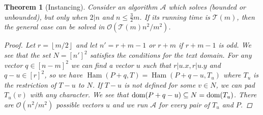 \documentclass[11pt]{article}
\renewcommand{\O}{\mathcal{O}}
\newcommand{\floor}[1]{\left\lfloor #1 \right\rfloor}
\theoremstyle{plain}
\newtheorem{theorem}{Theorem}
\theoremstyle{definition}
\theoremstyle{remark}
\DeclareMathOperator*{\Ham}{Ham}
\begin{document}
\begin{theorem}[Instancing]\label{instancing}
	Consider an algorithm $\mathcal{A}$ which solves \HD (bounded or unbounded), but only when $2|n$ and $n \le \frac{3}{2}m$.
	If its running time is $\mathcal{T}(m)$, then the general case can be solved in $\O(\mathcal{T}(m) n^2 / m^2)$.
	\begin{proof}
		Let $r = \floor{m / 2}$ and let $n' = r + m - 1$ or $r + m$ if $r + m - 1$ is odd.
		We see that the set $N = [n']^2$ satisfies the conditions for the text domain.
		For any vector $q \in [n - m]^2$ we can find a vector $u$ such that $r|u.x, r|u.y$ and $q - u \in [r]^2$,
		so we have $\Ham(P + q, T) = \Ham(P + q - u, T_u)$ where $T_u$ is the restriction of $T - u$ to $N$.
		If $T - u$ is not defined for some $v \in N$, we can pad $T_u(v)$ with any character.
		We see that $\operatorname*{dom}(P + q - u) \subseteq N = \operatorname*{dom}(T_u)$.
		There are $\O(n^2 / m^2)$ possible vectors $u$ and we run $\mathcal{A}$ for every pair of $T_u$ and $P$.
	\end{proof}
\end{theorem}
\end{document}

